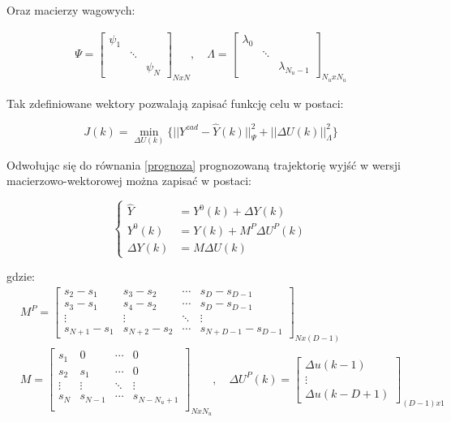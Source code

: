 \noindent Oraz macierzy wagowych:

\begin{equation}
\begin{aligned}
\Psi = \begin{bmatrix}
\psi_1 & & \\ & \ddots & \\ & & \psi_N
\end{bmatrix}_{NxN}, \quad
\Lambda = \begin{bmatrix}
\lambda_0 & & \\ & \ddots & \\ & & \lambda_{N_u-1}
\end{bmatrix}_{N_u x N_u}
\end{aligned}
\end{equation}

\noindent Tak zdefiniowane wektory pozwalają zapisać funkcję celu w postaci:

\begin{equation}
J(k) = \min_{\Delta U(k)} \{||Y^{zad} - \hat{Y}(k)||^2_\Psi + ||\Delta U(k)||^2_\Lambda \}
\label{cel}
\end{equation}

\noindent Odwołując się do równania \ref{prognoza} prognozowaną trajektorię wyjść w wersji macierzowo-wektorowej można zapisać w postaci:

\begin{equation}
\left\{
\begin{aligned}
\hat{Y} &= Y^0(k) + \Delta Y(k) \\
Y^0(k)& = Y(k) + M^P \Delta U^P(k) \\
\Delta Y(k) &= M \Delta U(k)
\end{aligned}
\right.
\end{equation}

\newpage

\noindent gdzie:
\begin{equation}
\begin{aligned}
&M^P = \begin{bmatrix}
s_2 - s_1 & s_3 - s_2 & \cdots & s_D - s_{D-1} \\
s_3 - s_1 & s_4 - s_2 & \cdots & s_D - s_{D-1} \\
\vdots & \vdots & \ddots & \vdots \\ 
s_{N+1} - s_1 & s_{N+2} - s_2 & \cdots & s_{N+D-1} - s_{D-1}
\end{bmatrix}_{Nx(D-1)} \\
&M = \begin{bmatrix}
s_1 & 0 & \cdots & 0 \\
s_2 & s_1 & \cdots & 0 \\ 
\vdots & \vdots & \ddots & \vdots \\
s_N & s_{N-1} & \cdots & s_{N-N_u+1} \\
\end{bmatrix}_{NxN_u}, \quad
\Delta U^P(k) = \begin{bmatrix}
\Delta u(k-1) \\ \vdots \\ \Delta u(k-D+1)
\end{bmatrix}_{(D-1)x1}
\end{aligned}
\end{equation}

